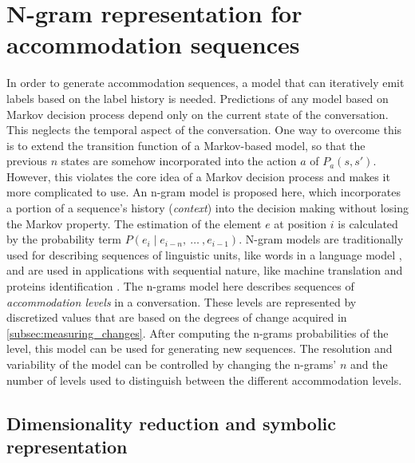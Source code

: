 \section{N-gram representation for accommodation sequences}
\label{sec:accommodation_as_a_lm}

In order to generate accommodation sequences, a model that can iteratively emit labels based on the label history is needed. 
Predictions of any model based on Markov decision process \citep{Bellman1957markovian} depend only on the current state of the conversation.
This neglects the temporal aspect of the conversation.
One way to overcome this is to extend the transition function of a Markov-based model, so that the previous $n$ states are somehow incorporated into the action $a$ of $P_a(s, s')$.
However, this violates the core idea of a Markov decision process and makes it more complicated to use.
An n-gram model is proposed here, which incorporates a portion of a sequence's history (\emph{context}) into the decision making without losing the Markov property.
The estimation of the element $e$ at position $i$ is calculated by the probability term $P(e_i \mid e_{i-n},\ \ldots\ , e_{i-1})$.
N-gram models are traditionally used for describing sequences of linguistic units, like words in a language model \citep[e.g.,][]{Niesler1996variable}, and are used in applications with sequential nature, like machine translation \citep{Marino2006ngram} and proteins identification \citep{Xu2015identification}.
The n-grams model here describes sequences of \emph{accommodation levels} in a conversation.
These levels are represented by discretized values that are based on the degrees of change acquired in \cref{subsec:measuring_changes}.
After computing the n-grams probabilities of the level, this model can be used for generating new sequences.
The resolution and variability of the model can be controlled by changing the n-grams' $n$ and the number of levels used to distinguish between the different accommodation levels.

\subsection{Dimensionality reduction and symbolic representation}
\label{subsec:dim_reduction_and_symbolic_rep}

